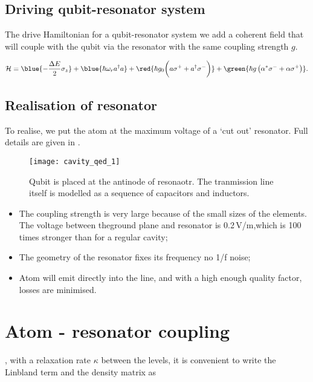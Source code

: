 \subsection{Driving qubit-resonator system}
\label{sec:driving-system}

The drive  Hamiltonian for  a qubit-resonator
system  we add  a  coherent  field that  will
couple with the qubit  via the resonator with
the same coupling strength $g$.

\begin{equation}
  \mathcal{H}     =\blue{-\frac{\Delta
      E}{2}\sigma_z}+\blue{{\hbar\omega_r}a^\dagger
    a}             +             \red{\hbar
    g_0\bigg({a\sigma^+}+{a^{\dagger}\sigma^-}\bigg)} + \green{\hbar g \left( \alpha^{*}\sigma^{-}+\alpha\sigma^{+} \right)}.
\end{equation}

\noindent

\subsection{Realisation of resonator}
To realise,  we put  the atom at  the maximum
voltage  of  a   `cut  out'  resonator.  Full
details are given in \cite{Blais_2004}.

\begin{figure}[h]
  \centering
  \texttt{[image: cavity\_qed\_1]}
  \caption{Qubit is placed at the antinode of
    resonaotr. The tranmission line itself is
    modelled as a  sequence of capacitors and
    inductors.}
\end{figure}

\noindent
\begin{itemize}
\item  The coupling  strength  is very  large
  because of the small sizes of the elements.
  The  voltage  between theground  plane  and
  resonator  is 0.2\,V/m,which  is 100  times
  stronger than for a regular cavity;
\item The geometry of the resonator fixes its
  frequency \ira no 1/f noise;
\item Atom will emit  directly into the line,
  and  with  a  high enough  quality  factor,
  losses are minimised.
\end{itemize}

\section{Atom - resonator coupling}
\noindent {},   with  a
relaxation rate $ \kappa  $ between the levels, it
is convenient to write  the Linbland term and
the density matrix as

